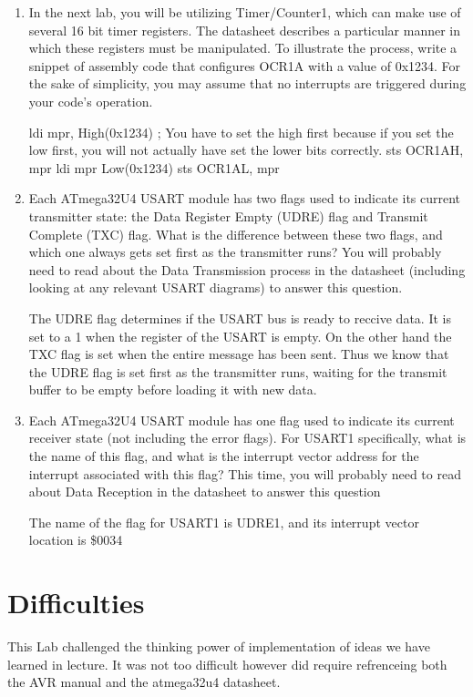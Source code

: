 \documentclass[12pt,letterpaper]{article}
\begin{document}
\begin{enumerate}
    

    
    \item 
	In the next lab, you will be utilizing Timer/Counter1, which can make use of several 16 bit timer registers. The datasheet describes a particular manner in which these registers must be manipulated. To illustrate the process,
	write a snippet of assembly code that configures OCR1A with a value of 0x1234. For the sake of simplicity, you may assume that no interrupts are triggered during your code’s operation.
	
	ldi mpr, High(0x1234) ; You have to set the high first because if you set the low first, you will not actually have set the lower bits correctly.
	sts OCR1AH, mpr
	ldi mpr Low(0x1234)
	sts OCR1AL, mpr
	
    
    \item
    Each ATmega32U4 USART module has two flags used to indicate its current transmitter state: the Data Register Empty (UDRE) flag and Transmit Complete (TXC) flag. What is the difference between these two flags, and which one always gets set first as the transmitter runs? You will probably need to read about the Data Transmission process in the datasheet (including looking at any relevant USART diagrams) to answer this question.
    
    The UDRE flag determines if the USART bus is ready to reccive data. It is set to a 1 when the register of the USART is empty. On the other hand the TXC flag is set when the entire message has been sent. Thus we know that the UDRE flag is set first as the transmitter runs, waiting for the transmit buffer to be empty before loading it with new data.
    
    \item 
    Each ATmega32U4 USART module has one flag used to indicate its current receiver state (not including the error flags). For USART1 specifically, what is the name of this flag, and what is the interrupt vector address for the
    interrupt associated with this flag? This time, you will probably need to read about Data Reception in the datasheet to answer this question
    
    The name of the flag for USART1 is UDRE1, and its interrupt vector location is \$0034 
    
       
    
\end{enumerate}

\section{Difficulties}
This Lab challenged the thinking power of implementation of ideas we have learned in lecture. It was not too difficult however did require refrenceing both the AVR manual and the atmega32u4 datasheet.
\end{document}
